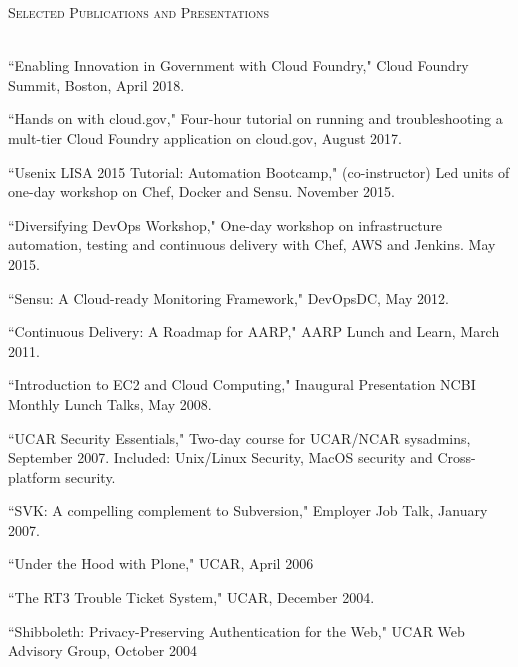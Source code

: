 \documentclass{article}
\newcommand{\lineunder}{\vspace*{-8pt} \\ \hspace*{-18pt} \hrulefill \\}
\newcommand{\header}[1]{{\hspace*{-15pt}\vspace*{6pt} \textsc{#1}} \vspace*{-6pt} \lineunder}
\newenvironment{achievements}{\begin{list}{\topsep 0pt \itemsep -2pt}} {\vspace*{4pt}\end{list}}
\begin{document}
\header{Selected Publications and Presentations}
\begin{achievements}
\item ``Enabling Innovation in Government with Cloud Foundry," Cloud Foundry Summit, Boston, April 2018.  
\item ``Hands on with cloud.gov," Four-hour tutorial on running and troubleshooting a mult-tier Cloud Foundry application on cloud.gov, August 2017.
\item ``Usenix LISA 2015 Tutorial: Automation Bootcamp," (co-instructor) Led units of one-day workshop on Chef, Docker and Sensu. November 2015.
\item ``Diversifying DevOps Workshop," One-day workshop on infrastructure automation, testing and continuous delivery with Chef, AWS and Jenkins. May 2015.
\item ``Sensu: A Cloud-ready Monitoring Framework," DevOpsDC, May 2012.
\item ``Continuous Delivery: A Roadmap for AARP," AARP Lunch and Learn, March 2011.
\item ``Introduction to EC2 and Cloud Computing," Inaugural Presentation NCBI Monthly Lunch Talks, May 2008.
\item ``UCAR Security Essentials,"  Two-day course for UCAR/NCAR sysadmins, September 2007. Included: Unix/Linux Security, MacOS security and Cross-platform security.
\item ``SVK: A compelling complement to Subversion," Employer Job Talk, January 2007.
\item ``Under the Hood with Plone," UCAR, April 2006
\item ``The RT3 Trouble Ticket System," UCAR, December 2004.
\item ``Shibboleth: Privacy-Preserving Authentication for the Web," UCAR Web Advisory Group, October 2004

\end{achievements}
\end{document}
